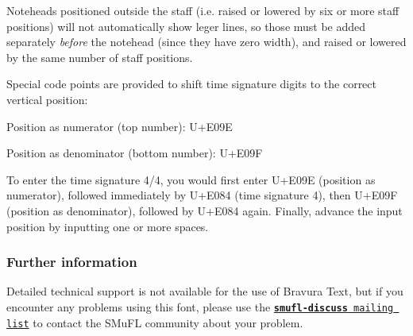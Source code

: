 Noteheads positioned outside the staff (i.\+e. raised or lowered by six or more staff positions) will not automatically show leger lines, so those must be added separately {\itshape before} the notehead (since they have zero width), and raised or lowered by the same number of staff positions.

Special code points are provided to shift time signature digits to the correct vertical position\+:


\begin{DoxyItemize}
\item Position as numerator (top number)\+: U+\+E09E
\item Position as denominator (bottom number)\+: U+\+E09F
\end{DoxyItemize}

To enter the time signature 4/4, you would first enter U+\+E09E (position as numerator), followed immediately by U+\+E084 (time signature 4), then U+\+E09F (position as denominator), followed by U+\+E084 again. Finally, advance the input position by inputting one or more spaces.

\subsubsection*{Further information}

Detailed technical support is not available for the use of Bravura Text, but if you encounter any problems using this font, please use the \href{http://www.smufl.org/discuss}{\tt {\bfseries smufl-\/discuss} mailing list} to contact the S\+Mu\+FL community about your problem. 